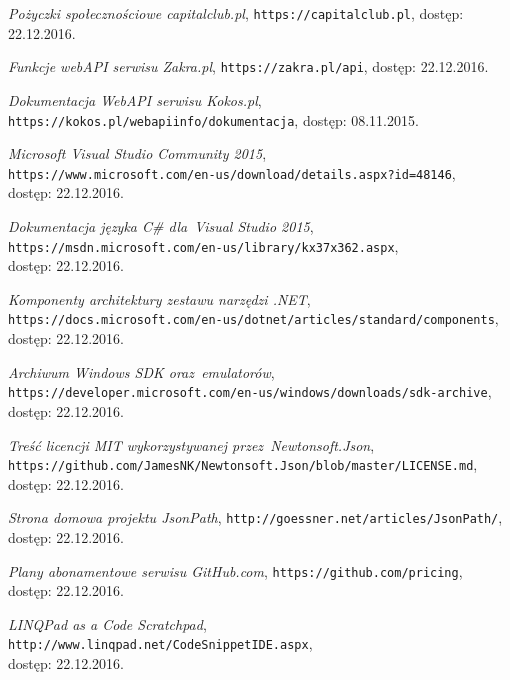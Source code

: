 \documentclass[a4paper,twoside,titlepage,openright]{book}
\begin{document}
\begin{thebibliography}{99}
 \textit{Pożyczki społecznościowe capitalclub.pl}, 
\texttt{https://capitalclub.pl}, dostęp: 22.12.2016.

 \textit{Funkcje webAPI serwisu Zakra.pl}, 
\texttt{https://zakra.pl/api}, dostęp: 22.12.2016.

 \textit{Dokumentacja WebAPI serwisu Kokos.pl}, 
\texttt{https://kokos.pl/webapiinfo/dokumentacja}, dostęp: 08.11.2015.

 \textit{Microsoft Visual Studio Community 2015}, \\
\texttt{https://www.microsoft.com/en-us/download/details.aspx?id=48146}, \\dostęp: 22.12.2016.

 \textit{Dokumentacja języka C\# dla~Visual Studio 2015}, \\
\texttt{https://msdn.microsoft.com/en-us/library/kx37x362.aspx}, \\dostęp: 22.12.2016.

 \textit{Komponenty architektury zestawu narzędzi .NET}, \\
\texttt{https://docs.microsoft.com/en-us/dotnet/articles/standard/components},\\ dostęp: 22.12.2016.

 \textit{Archiwum Windows SDK oraz~emulatorów}, \\
\texttt{https://developer.microsoft.com/en-us/windows/downloads/sdk-archive}, \\dostęp: 22.12.2016.

 \textit{Treść licencji MIT wykorzystywanej przez~Newtonsoft.Json}, \\
\texttt{https://github.com/JamesNK/Newtonsoft.Json/blob/master/LICENSE.md}, \\dostęp: 22.12.2016.

 \textit{Strona domowa projektu JsonPath}, 
\texttt{http://goessner.net/articles/JsonPath/}, \\dostęp: 22.12.2016.

 \textit{Plany abonamentowe serwisu GitHub.com}, 
\texttt{https://github.com/pricing}, \\dostęp: 22.12.2016.

 \textit{LINQPad as a Code Scratchpad}, 
\texttt{http://www.linqpad.net/CodeSnippetIDE.aspx}, \\dostęp: 22.12.2016.


\end{thebibliography}
\end{document}

